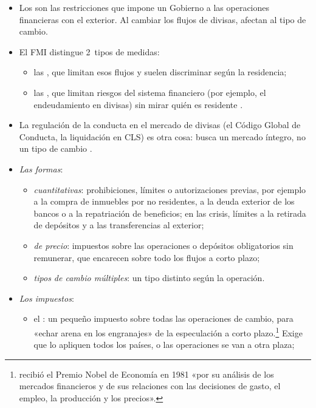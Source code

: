 \documentclass[11pt]{article}
\begin{document}
\begin{itemize}
\item Los  son las restricciones que impone un Gobierno a las operaciones financieras con el exterior. Al cambiar los flujos de divisas, afectan al tipo de cambio.
\item El FMI distingue 2~tipos de medidas\nocite{FMI2012VisionInstitucional}:
  \begin{itemize}
  \item las , que limitan esos flujos y suelen discriminar según la residencia;
  \item las , que limitan riesgos del sistema financiero (por ejemplo, el endeudamiento en divisas) sin mirar quién es residente .
  \end{itemize}
\item La regulación de la conducta en el mercado de divisas (el Código Global de Conducta, la liquidación en CLS) es otra cosa: busca un mercado íntegro, no un tipo de cambio .
\item \emph{Las formas}:
  \begin{itemize}
  \item \emph{cuantitativas}: prohibiciones, límites o autorizaciones previas, por ejemplo a la compra de inmuebles por no residentes, a la deuda exterior de los bancos o a la repatriación de beneficios; en las crisis, límites a la retirada de depósitos y a las transferencias al exterior;
  \item \emph{de precio}: impuestos sobre las operaciones o depósitos obligatorios sin remunerar, que encarecen sobre todo los flujos a corto plazo;
  \item \emph{tipos de cambio múltiples}: un tipo distinto según la operación.
  \end{itemize}
\item \emph{Los impuestos}:
  \begin{itemize}
  \item el : un pequeño impuesto sobre todas las operaciones de cambio, para «echar arena en los engranajes» de la especulación a corto plazo\nocite{Tobin1978Proposal}.\footnote{ recibió el Premio Nobel de Economía en 1981 «por su análisis de los mercados financieros y de sus relaciones con las decisiones de gasto, el empleo, la producción y los precios»\nocite{Nobel1981Tobin}.} Exige que lo apliquen todos los países, o las operaciones se van a otra plaza;

\end{itemize}
\end{itemize}
\end{document}
